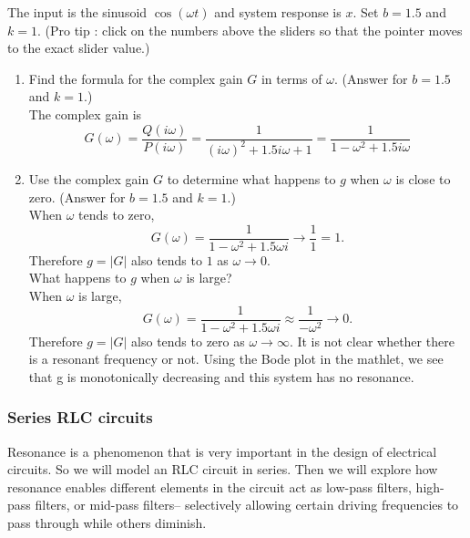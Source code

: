 The input is the sinusoid $\cos ⁡(\omega t)$ and system response is $x$.
Set $b=1.5$ and $k=1$.
(Pro tip : click on the numbers above the sliders so that the pointer moves to the exact slider value.)

\begin{enumerate}
\item Find the formula for the complex gain $G$ in terms of $\omega$.
  (Answer for $b=1.5$ and $k=1$.) \\
  The complex gain is
  \begin{equation*}
    G(\omega) = \frac{Q(i \omega)}{P(i \omega)} = \frac{1}{(i \omega)^2 + 1.5 i \omega + 1}
    = \frac{1}{1 - \omega ^2  + 1.5 i \omega }
  \end{equation*}
\item Use the complex gain $G$ to determine what happens
  to $g$ when $\omega$ is close to zero. (Answer for $b=1.5$ and $k=1$.) \\
  When $\omega$ tends to zero,
  \begin{equation*}
    G(\omega ) = \frac{1}{1-\omega ^2+1.5 \omega i} \rightarrow \frac{1}{1} =1.
  \end{equation*}
  Therefore $g=|G|$ also tends to $1$ as $\omega \rightarrow 0$.\\

  What happens to $g$ when $\omega$ is large?\\
  When $\omega$ is large,
  \begin{equation*}
    G(\omega ) = \frac{1}{1-\omega ^2+1.5 \omega i} \approx \frac{1}{-\omega ^2} \rightarrow 0.
  \end{equation*}
  Therefore $g=|G|$ also tends to zero as $\omega \rightarrow \infty$.
  It is not clear whether there is a resonant frequency or not.
  Using the Bode plot in the mathlet,
  we see that g is monotonically decreasing and this system has no resonance.  
\end{enumerate}
\clearpage

\subsubsection{Series RLC circuits}

Resonance is a phenomenon that is very important in the design of electrical circuits.
So we will model an RLC circuit in series.
Then we will explore how resonance enables different elements in the circuit act as low-pass filters, high-pass filters, or mid-pass filters– selectively allowing certain
driving frequencies to pass through while others diminish.\\

